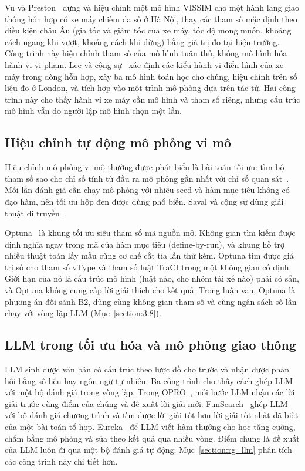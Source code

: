 \documentclass[../main.tex]{subfiles}
\begin{document}
Vu và Preston~\cite{vu2023vissim} dựng và hiệu chỉnh một mô hình VISSIM cho một hành lang giao thông hỗn hợp có xe máy chiếm đa số ở Hà Nội, thay các tham số mặc định theo điều kiện châu Âu (gia tốc và giảm tốc của xe máy, tốc độ mong muốn, khoảng cách ngang khi vượt, khoảng cách khi dừng) bằng giá trị đo tại hiện trường. Công trình này hiệu chỉnh tham số của mô hình tuân thủ, không mô hình hóa hành vi vi phạm. Lee và cộng sự~\cite{lee2009motorcycles} xác định các kiểu hành vi điển hình của xe máy trong dòng hỗn hợp, xây ba mô hình toán học cho chúng, hiệu chỉnh trên số liệu đo ở London, và tích hợp vào một trình mô phỏng dựa trên tác tử. Hai công trình này cho thấy hành vi xe máy cần mô hình và tham số riêng, nhưng cấu trúc mô hình vẫn do người lập mô hình chọn một lần.

\subsection{Hiệu chỉnh tự động mô phỏng vi mô}
\label{subsection:2.1.4}

Hiệu chỉnh mô phỏng vi mô thường được phát biểu là bài toán tối ưu: tìm bộ tham số sao cho chỉ số tính từ đầu ra mô phỏng gần nhất với chỉ số quan sát~\cite{hollander2008calibration}. Mỗi lần đánh giá cần chạy mô phỏng với nhiều seed và hàm mục tiêu không có đạo hàm, nên tối ưu hộp đen được dùng phổ biến. Saval và cộng sự dùng giải thuật di truyền~\cite{saval2023mixed}.

Optuna~\cite{akiba2019optuna} là khung tối ưu siêu tham số mã nguồn mở. Không gian tìm kiếm được định nghĩa ngay trong mã của hàm mục tiêu (define-by-run), và khung hỗ trợ nhiều thuật toán lấy mẫu cùng cơ chế cắt tỉa lần thử kém. Optuna tìm được giá trị số cho tham số vType và tham số luật TraCI trong một không gian cố định. Giới hạn của nó là cấu trúc mô hình (luật nào, cho nhóm tài xế nào) phải có sẵn, và Optuna không cung cấp lời giải thích cho kết quả. Trong luận văn, Optuna là phương án đối sánh B2, dùng cùng không gian tham số và cùng ngân sách số lần chạy với vòng lặp LLM (Mục~\ref{section:3.8}).

\subsection{LLM trong tối ưu hóa và mô phỏng giao thông}
\label{subsection:2.1.llm}

LLM sinh được văn bản có cấu trúc theo lược đồ cho trước và nhận được phản hồi bằng số liệu hay ngôn ngữ tự nhiên. Ba công trình cho thấy cách ghép LLM với một bộ đánh giá trong vòng lặp. Trong OPRO~\cite{yang2024opro}, mỗi bước LLM nhận các lời giải trước cùng điểm của chúng và đề xuất lời giải mới. FunSearch~\cite{romeraparedes2024funsearch} ghép LLM với bộ đánh giá chương trình và tìm được lời giải tốt hơn lời giải tốt nhất đã biết của một bài toán tổ hợp. Eureka~\cite{ma2024eureka} để LLM viết hàm thưởng cho học tăng cường, chấm bằng mô phỏng và sửa theo kết quả qua nhiều vòng. Điểm chung là đề xuất của LLM luôn đi qua một bộ đánh giá tự động; Mục~\ref{section:rg_llm} phân tích các công trình này chi tiết hơn.
\end{document}
